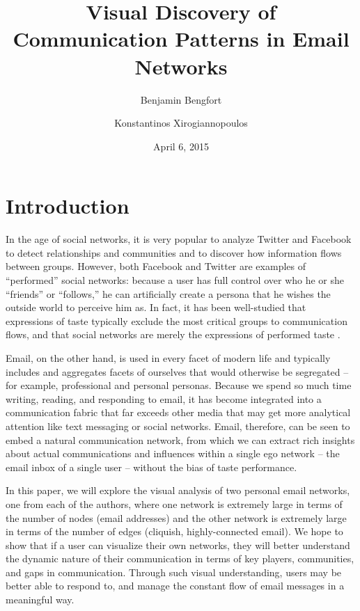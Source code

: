 \documentclass[11pt,letterpaper]{article}
\begin{document}
\title{Visual Discovery of Communication Patterns in Email Networks}

\author[ ]{Benjamin Bengfort}
\author[ ]{Konstantinos Xirogiannopoulos}

\date{April 6, 2015}

\maketitle

\section*{Introduction}

In the age of social networks, it is very popular to analyze Twitter and Facebook to detect relationships and communities and to discover how information flows between groups. However, both Facebook and Twitter are examples of ``performed'' social networks: because a user has full control over who he or she ``friends'' or ``follows,'' he can artificially create a persona that he wishes the outside world to perceive him as. In fact, it has been well-studied that expressions of taste typically exclude the most critical groups to communication flows, and that social networks are merely the expressions of performed taste \cite{liu_social_2007}.

Email, on the other hand, is used in every facet of modern life and typically includes and aggregates facets of ourselves that would otherwise be segregated -- for example, professional and personal personas. Because we spend so much time writing, reading, and responding to email, it has become integrated into a communication fabric that far exceeds other media that may get more analytical attention like text messaging or social networks. Email, therefore, can be seen to embed a natural communication network, from which we can extract rich insights about actual communications and influences within a single ego network -- the email inbox of a single user -- without the bias of taste performance.

In this paper, we will explore the visual analysis of two personal email networks, one from each of the authors, where one network is extremely large in terms of the number of nodes (email addresses) and the other network is extremely large in terms of the number of edges (cliquish, highly-connected email). We hope to show that if a user can visualize their own networks, they will better understand the dynamic nature of their communication in terms of key players, communities, and gaps in communication. Through such visual understanding, users may be better able to respond to, and manage the constant flow of email messages in a meaningful way.
\end{document}
